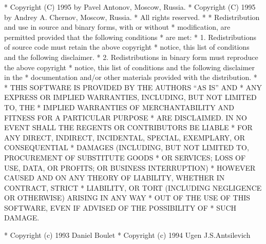 \begin{copyrightEnv}
 * Copyright (C) 1995 by Pavel Antonov, Moscow, Russia.
 * Copyright (C) 1995 by Andrey A. Chernov, Moscow, Russia.
 * All rights reserved.
 *
 * Redistribution and use in source and binary forms, with or without
 * modification, are permitted provided that the following conditions
 * are met:
 * 1. Redistributions of source code must retain the above copyright
 *    notice, this list of conditions and the following disclaimer.
 * 2. Redistributions in binary form must reproduce the above copyright
 *    notice, this list of conditions and the following disclaimer in the
 *    documentation and/or other materials provided with the distribution.
 *
 * THIS SOFTWARE IS PROVIDED BY THE AUTHORS ``AS IS'' AND
 * ANY EXPRESS OR IMPLIED WARRANTIES, INCLUDING, BUT NOT LIMITED TO, THE
 * IMPLIED WARRANTIES OF MERCHANTABILITY AND FITNESS FOR A PARTICULAR PURPOSE
 * ARE DISCLAIMED.  IN NO EVENT SHALL THE REGENTS OR CONTRIBUTORS BE LIABLE
 * FOR ANY DIRECT, INDIRECT, INCIDENTAL, SPECIAL, EXEMPLARY, OR CONSEQUENTIAL
 * DAMAGES (INCLUDING, BUT NOT LIMITED TO, PROCUREMENT OF SUBSTITUTE GOODS
 * OR SERVICES; LOSS OF USE, DATA, OR PROFITS; OR BUSINESS INTERRUPTION)
 * HOWEVER CAUSED AND ON ANY THEORY OF LIABILITY, WHETHER IN CONTRACT, STRICT
 * LIABILITY, OR TORT (INCLUDING NEGLIGENCE OR OTHERWISE) ARISING IN ANY WAY
 * OUT OF THE USE OF THIS SOFTWARE, EVEN IF ADVISED OF THE POSSIBILITY OF
 * SUCH DAMAGE.
\end{copyrightEnv}

\begin{copyrightEnv}
 * Copyright (c) 1993 Daniel Boulet
 * Copyright (c) 1994 Ugen J.S.Antsilevich
\end{copyrightEnv}

